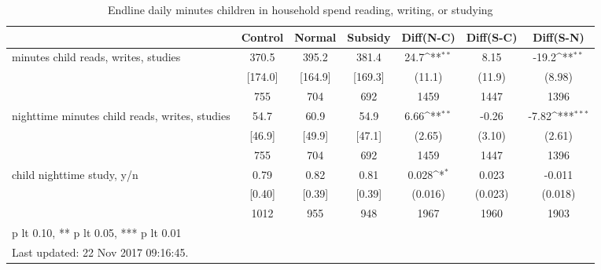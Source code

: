 \begin{table}[htbp]\centering
\def\sym#1{\ifmmode^{#1}\else\(^{#1}\)\fi}
\caption{Endline daily minutes children in household spend reading, writing, or studying \label{tab:"balance"}}
\begin{tabular*}{1\hsize}{@{\hskip\tabcolsep\extracolsep\fill}l*{1}{cccccc}}
\toprule
                                &  Control&   Normal&  Subsidy&Diff(N-C)         &Diff(S-C)         &Diff(S-N)         \\
\midrule
minutes child reads, writes, studies&    370.5&    395.2&    381.4&     24.7\sym{**} &     8.15         &    -19.2\sym{**} \\
                                &  [174.0]&  [164.9]&  [169.3]&   (11.1)         &   (11.9)         &   (8.98)         \\
                                &      755&      704&      692&     1459         &     1447         &     1396         \\
nighttime minutes child reads, writes, studies&     54.7&     60.9&     54.9&     6.66\sym{**} &    -0.26         &    -7.82\sym{***}\\
                                &   [46.9]&   [49.9]&   [47.1]&   (2.65)         &   (3.10)         &   (2.61)         \\
                                &      755&      704&      692&     1459         &     1447         &     1396         \\
child nighttime study, y/n      &     0.79&     0.82&     0.81&    0.028\sym{*}  &    0.023         &   -0.011         \\
                                &   [0.40]&   [0.39]&   [0.39]&  (0.016)         &  (0.023)         &  (0.018)         \\
                                &     1012&      955&      948&     1967         &     1960         &     1903         \\
\bottomrule
\multicolumn{7}{l}{\footnotesize * p lt 0.10, ** p lt 0.05, *** p lt 0.01}\\
\multicolumn{7}{l}{\footnotesize Last updated: 22 Nov 2017 09:16:45.}\\
\end{tabular*}
\end{table}
